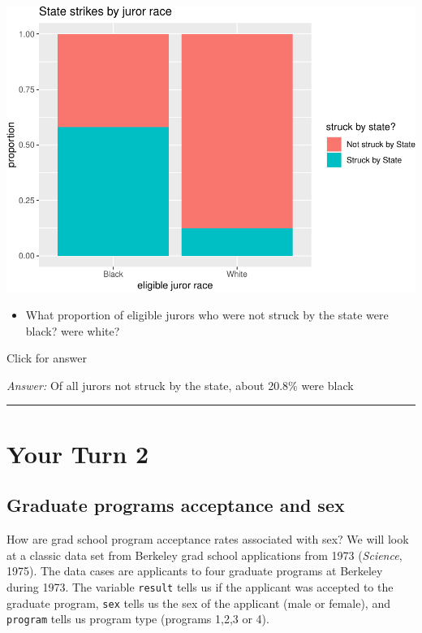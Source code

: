 \documentclass[
]{book}
\providecommand{\tightlist}{%
  \setlength{\itemsep}{0pt}\setlength{\parskip}{0pt}}
\begin{document}
\includegraphics[width=1\linewidth]{Class_Activity_4_files/figure-latex/unnamed-chunk-15-1}

\begin{itemize}
\tightlist
\item
  What proportion of eligible jurors who were not struck by the state were black? were white?
\end{itemize}

Click for answer

\emph{Answer:} Of all jurors not struck by the state, about 20.8\% were black

\begin{center}\rule{0.5\linewidth}{0.5pt}\end{center}

\hypertarget{your-turn-2-2}{%
\section{Your Turn 2}\label{your-turn-2-2}}

\hypertarget{graduate-programs-acceptance-and-sex}{%
\subsection{Graduate programs acceptance and sex}\label{graduate-programs-acceptance-and-sex}}

How are grad school program acceptance rates associated with sex? We will look at a classic data set from Berkeley grad school applications from 1973 (\emph{Science}, 1975). The data cases are applicants to four graduate programs at Berkeley during 1973. The variable \texttt{result} tells us if the applicant was accepted to the graduate program, \texttt{sex} tells us the sex of the applicant (male or female), and \texttt{program} tells us program type (programs 1,2,3 or 4).
\end{document}
